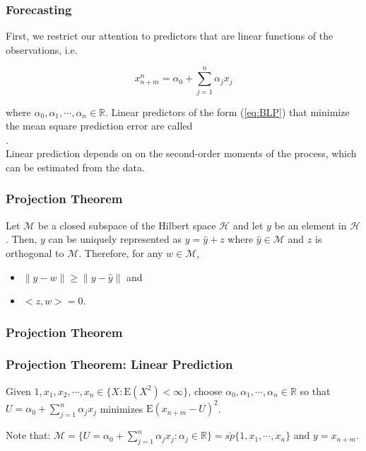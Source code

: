 \documentclass[%
xcolor=pdftex]{beamer}
\begin{document}
\begin{frame}
\frametitle{Forecasting}

First, we restrict our attention to predictors that are linear functions of the observations, i.e.

\begin{equation} \label{eq:BLP}
x_{n+m}^n = \alpha_0 + \sum_{j=1}^n \alpha_j x_j
\end{equation}

where $\alpha_0, \alpha_1, \cdots, \alpha_n \in \mathbb{R}$. Linear predictors of the form (\ref{eq:BLP}) that minimize the mean square prediction error are called \underline{\hspace{20 mm}} \\ \underline{\hspace{30 mm}}.\\

\vspace{5mm}
Linear prediction depends on on the second-order moments of the process, which can be estimated from the data.

\end{frame}

\begin{frame}
\frametitle{Projection Theorem}

\begin{theorem}
\label{projection}
Let $\mathcal{M}$ be a closed subspace of the Hilbert space $\mathcal{H}$ and let $y$ be an element in $\mathcal{H}$. Then, $y$ can be uniquely represented as $y = \hat{y} + z$ where $\hat{y} \in \mathcal{M}$ and $z$ is orthogonal to $\mathcal{M}$. Therefore, for any $w \in \mathcal{M}$,

\begin{itemize}
\item $\lVert y-w \rVert \geq \lVert y-\hat{y} \rVert$ and
\item $<z,w> = 0$.
\end{itemize}
\end{theorem}


\end{frame}

\begin{frame}
\frametitle{Projection Theorem}


\end{frame}

\begin{frame}
\frametitle{Projection Theorem: Linear Prediction}

Given $1, x_1, x_2, \cdots, x_n \in \{X: \mbox{E}(X^2) < \infty \}$, choose $\alpha_0, \alpha_1, \cdots, \alpha_n \in \mathbb{R}$ so that $U = \alpha_0 + \sum_{j=1}^n \alpha_j x_j$ minimizes $\mbox{E}(x_{n+m} - U)^2$.\\
\vspace{5mm}

Note that: $\mathcal{M} = \{U = \alpha_0 + \sum_{j=1}^n \alpha_j x_j: \alpha_j \in \mathbb{R} \} = \bar{sp}\{1,x_1, \cdots, x_n \}$ and $y=x_{n+m}$.
\end{frame}
\end{document}
